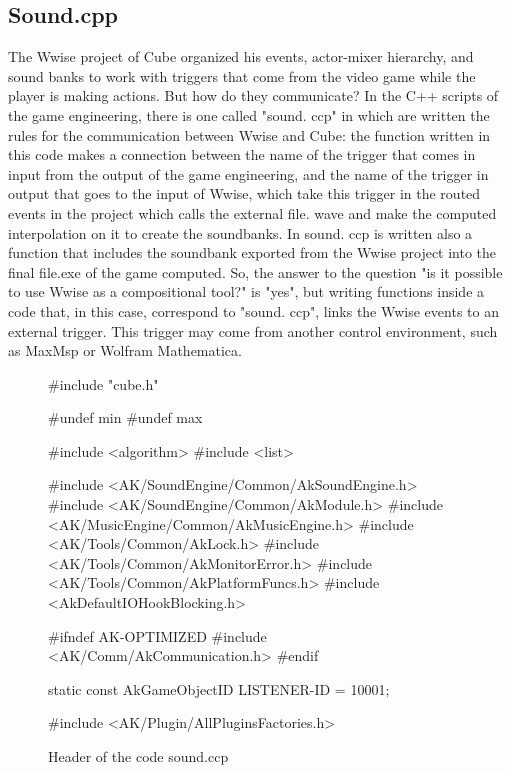 		\subsection{Sound.cpp}
		The Wwise project of Cube organized his events, actor-mixer hierarchy, and sound banks to work with triggers that come from the video game while the player is making actions. But how do they communicate? In the C++ scripts of the game engineering, there is one called "sound. ccp" in which are written the rules for the communication between Wwise and Cube: the function written in this code makes a connection between the name of the trigger that comes in input from the output of the game engineering, and the name of the trigger in output that goes to the input of Wwise, which take this trigger in the routed events in the project which calls the external file. wave and make the computed interpolation on it to create the soundbanks. In sound. ccp is written also a function that includes the soundbank exported from the Wwise project into the final file.exe of the game computed.
		So, the answer to the question "is it possible to use Wwise as a compositional tool?" is "yes", but writing functions inside a code that, in this case, correspond to "sound. ccp", links the Wwise events to an external trigger. This trigger may come from another control environment, such as MaxMsp or Wolfram Mathematica.
		
		\begin{figure}[h]
			\begin{center}
				\begin{code}
					#include "cube.h"
					
					#undef min
					#undef max
					
					#include <algorithm>
					#include <list>
					
					#include <AK/SoundEngine/Common/AkSoundEngine.h>
					#include <AK/SoundEngine/Common/AkModule.h>
					#include <AK/MusicEngine/Common/AkMusicEngine.h>
					#include <AK/Tools/Common/AkLock.h>
					#include <AK/Tools/Common/AkMonitorError.h>
					#include <AK/Tools/Common/AkPlatformFuncs.h>
					#include <AkDefaultIOHookBlocking.h>
					
					#ifndef AK-OPTIMIZED
					#include <AK/Comm/AkCommunication.h>
					#endif
					
					static const AkGameObjectID LISTENER-ID = 10001;
					
					#include <AK/Plugin/AllPluginsFactories.h>
				\end{code}
				\caption{Header of the code sound.ccp}
			\end{center}
		\end{figure}
	

